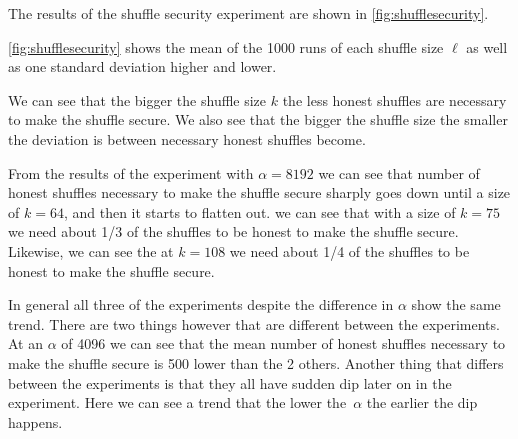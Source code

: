 The results of the shuffle security experiment are shown in \autoref{fig:shufflesecurity}.

\autoref{fig:shufflesecurity} shows the mean of the 1000 runs of each shuffle size $\ell$ as well as one standard deviation higher and lower.

We can see that the bigger the shuffle size $k$ the less honest shuffles are necessary to make the shuffle secure.
We also see that the bigger the shuffle size the smaller the deviation is between necessary honest shuffles become.

From the results of the experiment with $\alpha=8192$ we can see that number of honest shuffles necessary to make the shuffle secure sharply goes down until a size of $k=64$, and then it starts to flatten out.
we can see that with a size of $k=75$ we need about 1/3 of the shuffles to be honest to make the shuffle secure.
Likewise, we can see the at $k=108$ we need about 1/4 of the shuffles to be honest to make the shuffle secure.

In general all three of the experiments despite the difference in $\alpha$ show the same trend.
There are two things however that are different between the experiments.
At an $\alpha$ of 4096 we can see that the mean number of honest shuffles necessary to make the shuffle secure is 500 lower than the 2 others.
Another thing that differs between the experiments is that they all have sudden dip later on in the experiment.
Here we can see a trend that the lower the~$\alpha$ the earlier the dip happens.